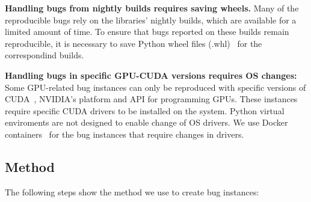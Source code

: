 \documentclass[sigconf,screen]{acmart}
\begin{document}
\textbf{Handling bugs from nightly builds requires saving wheels.}
Many of the reproducible bugs rely on the libraries' nightly builds,
which are available for a limited amount of time. To ensure that bugs
reported on these builds remain reproducible, it is necessary to save
Python wheel files (.whl)~\cite{wheels} for the correspondind builds.

\textbf{Handling bugs in specific GPU-CUDA versions requires OS
  changes:} Some GPU-related bug instances can only be reproduced with
specific versions of CUDA~\cite{cuda}, NVIDIA's platform and API for
programming GPUs. These instances require specific CUDA drivers to be
installed on the system. Python virtual enviroments are not designed
to enable change of OS drivers.
We use Docker containers~\cite{merkel2014docker} for the bug instances
that require changes in drivers.

\subsection{Method}
\label{sec:method}

The following steps show the method we use to create bug instances:
\end{document}
